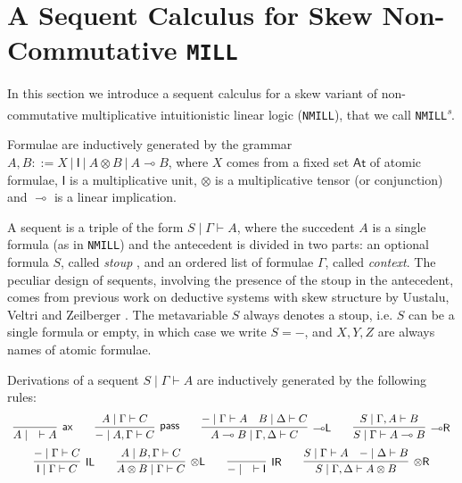 \documentclass[copyright,creativecommons]{eptcs}
\theoremstyle{definition}
\newtheorem{defn}{Definition}[section]
\newcommand{\tl}{\otimes \mathsf{L}}
\newcommand{\tr}{\otimes \mathsf{R}}
\newcommand{\lright}{{\multimap}\mathsf{R}}
\newcommand{\lleft}{{\multimap}\mathsf{L}}
\newcommand{\pass}{\mathsf{pass}}
\newcommand{\unitl}{\mathsf{IL}}
\newcommand{\unitr}{\mathsf{IR}}
\newcommand{\ax}{\mathsf{ax}}
\newcommand{\ot}{\otimes}
\newcommand{\lolli}{\multimap}
\newcommand{\I}{\mathsf{I}}
\newcommand{\MILL}{\texttt{MILL}}
\newcommand{\NMILL}{\texttt{NMILL}}
\newcommand{\SkNMILL}{\NMILL\textsuperscript{\textit{s}}}
\begin{document}
\section{A Sequent Calculus for Skew Non-Commutative \MILL}\label{sec2}
In this section we introduce a sequent calculus for a skew variant of non-commutative multiplicative intuitionistic linear logic (\NMILL), that we call \SkNMILL.

Formulae are inductively generated by the grammar $A,B ::= X \ | \ \I \ | \ A \ot B \ | \ A \lolli B$, where $X$ comes from a fixed set $\mathsf{At}$ of atomic formulae, $\I$ is a multiplicative unit, $\ot$ is a multiplicative tensor (or conjunction) and $\lolli$ is a linear implication.

A sequent is a triple of the form $S \mid \Gamma \vdash A$, where the succedent $A$ is a single formula (as in \NMILL) and the antecedent is divided in two parts: an optional formula $S$, called \emph{stoup} \cite{girard:constructive:91}, and an ordered list of formulae $\Gamma$, called \emph{context}. The peculiar design of sequents, involving the presence of the stoup in the antecedent, comes from previous work on deductive systems with skew structure by Uustalu, Veltri and Zeilberger \cite{uustalu:sequent:2021,uustalu:proof:nodate,uustalu:deductive:nodate,veltri:coherence:2021}.
The metavariable $S$ always denotes a stoup, i.e. $S$ can be a single formula or empty, in which case we write $S = -$, and $X,Y,Z$ are always names of atomic formulae.

Derivations of a sequent $S \mid \Gamma \vdash A$ are inductively generated by the following rules:
\begin{equation}\label{eq:seqcalc}
  \def\arraystretch{2.5}
  \begin{array}{c}
    \infer[\ax]{A \mid \quad \vdash A}{}
    \qquad
    \infer[\pass]{{-} \mid A , \Gamma \vdash C}{A \mid \Gamma \vdash C}
    \qquad
    \infer[\lleft]{A \lolli B \mid \Gamma , \Delta \vdash C}{
      {-} \mid \Gamma \vdash A
      &
      B \mid \Delta \vdash C
    }
    \qquad
    \infer[\lright]{S \mid \Gamma \vdash A \lolli B}{S \mid \Gamma , A \vdash B}
    \\
    \infer[\unitl]{\I \mid \Gamma \vdash C}{{-} \mid \Gamma \vdash C}
    \qquad
    \infer[\tl]{A \ot B \mid \Gamma \vdash C}{A \mid B , \Gamma \vdash C}
    \qquad
    \infer[\unitr]{{-} \mid \quad \vdash \I}{}
    \qquad
    \infer[\tr]{S \mid \Gamma , \Delta \vdash A \ot B}{
      S \mid \Gamma \vdash A
      &
      {-} \mid \Delta \vdash B
    }
  \end{array}
\end{equation}
\end{document}
